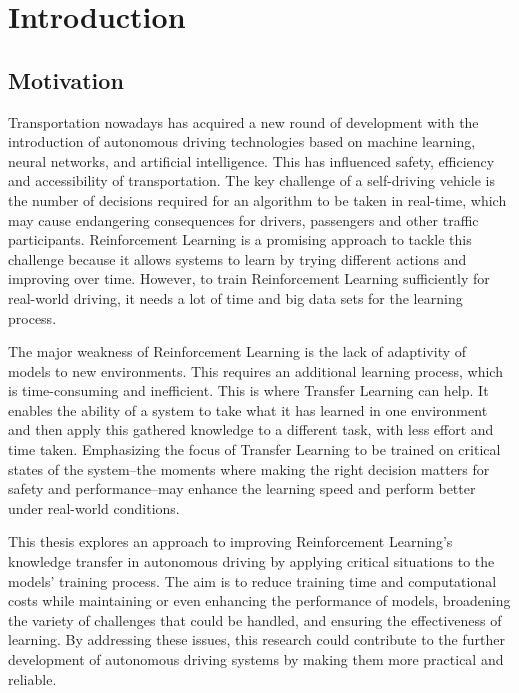 \section{Introduction}\label{chap:chap_1}


\subsection{Motivation}

Transportation nowadays has acquired a new round of development with the introduction of autonomous driving technologies based on machine learning, neural networks, and artificial intelligence. This has influenced safety, efficiency and accessibility of transportation. The key challenge of a self-driving vehicle is the number of decisions required for an algorithm to be taken in real-time, which may cause endangering consequences for drivers, passengers and other traffic participants. Reinforcement Learning is a promising approach to tackle this challenge because it allows systems to learn by trying different actions and improving over time. However, to train Reinforcement Learning sufficiently for real-world driving, it needs a lot of time and big data sets for the learning process.

The major weakness of Reinforcement Learning is the lack of adaptivity of models to new environments. This requires an additional learning process, which is time-consuming and inefficient. This is where Transfer Learning can help. It enables the ability of a system to take what it has learned in one environment and then apply this gathered knowledge to a different task, with less effort and time taken. Emphasizing the focus of Transfer Learning to be trained on critical states of the system--the moments where making the right decision matters for safety and performance--may enhance the learning speed and perform better under real-world conditions.

This thesis explores an approach to improving Reinforcement Learning's knowledge transfer in autonomous driving by applying critical situations to the models' training process. The aim is to reduce training time and computational costs while maintaining or even enhancing the performance of models, broadening the variety of challenges that could be handled, and ensuring the effectiveness of learning. By addressing these issues, this research could contribute to the further development of autonomous driving systems by making them more practical and reliable.

